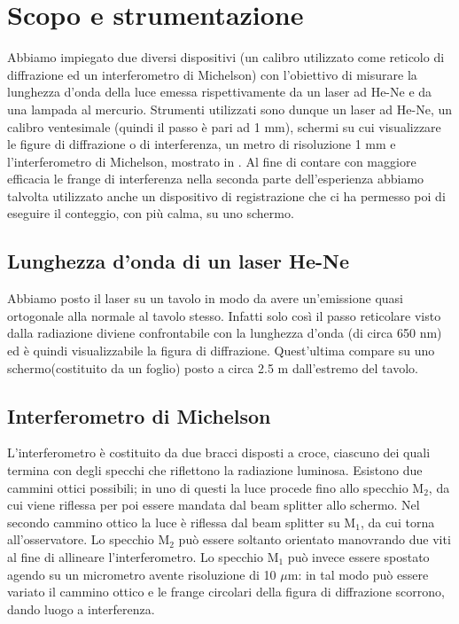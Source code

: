\section{Scopo e strumentazione}

Abbiamo impiegato due diversi dispositivi (un calibro utilizzato come reticolo di diffrazione ed un interferometro di Michelson) con l'obiettivo di misurare la lunghezza d'onda della luce emessa rispettivamente da un laser ad He-Ne e da una lampada al mercurio. Strumenti utilizzati sono dunque un laser ad He-Ne, un calibro ventesimale (quindi il passo è pari ad 1 mm), schermi su cui visualizzare le figure di diffrazione o di interferenza, un metro di risoluzione 1 mm e l'interferometro di Michelson, mostrato in . Al fine di contare con maggiore efficacia le frange di interferenza nella seconda parte dell'esperienza abbiamo talvolta utilizzato anche un dispositivo di registrazione che ci ha permesso poi di eseguire il conteggio, con più calma, su uno schermo.\\
\subsection{Lunghezza d'onda di un laser He-Ne}
Abbiamo posto il laser su un tavolo in modo da avere un'emissione quasi ortogonale alla normale al tavolo stesso. Infatti solo così il passo reticolare visto dalla radiazione diviene confrontabile con la lunghezza d'onda (di circa 650 nm) ed è quindi visualizzabile la figura di diffrazione. Quest'ultima compare su uno schermo(costituito da un foglio) posto a circa 2.5 m dall'estremo del tavolo.\\
\subsection{Interferometro di Michelson}
L'interferometro è costituito da due bracci disposti a croce, ciascuno dei quali termina con degli specchi che riflettono la radiazione luminosa. Esistono due cammini ottici possibili; in uno di questi la luce procede fino allo specchio M$_2$, da cui viene riflessa per poi essere mandata dal beam splitter allo schermo. Nel secondo cammino ottico la luce è riflessa dal beam splitter su M$_1$, da cui torna all'osservatore. Lo specchio M$_2$ può essere soltanto orientato manovrando due viti al fine di allineare l'interferometro. Lo specchio M$_1$ può invece essere spostato agendo su un micrometro avente risoluzione di 10 $\mu$m: in tal modo può essere variato il cammino ottico e le frange circolari della figura di diffrazione scorrono, dando luogo a interferenza.

